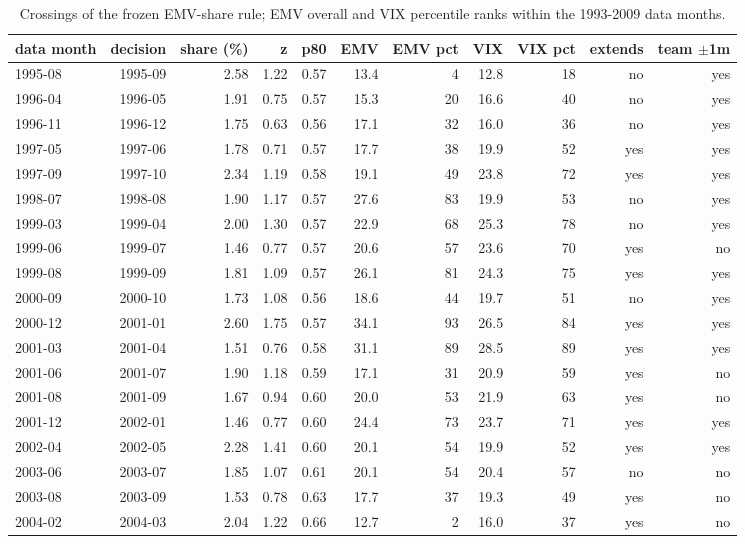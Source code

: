 \begin{table}[htbp]\centering\footnotesize\setlength{\tabcolsep}{4pt}
\caption{Crossings of the frozen EMV-share rule; EMV overall and VIX percentile ranks within the 1993-2009 data months.}
\label{tab:m8_crossings}
\begin{tabular}{lrrrrrrrrrr}
\toprule
data month & decision & share (\%) & z & p80 & EMV & EMV pct & VIX & VIX pct & extends & team $\pm$1m \\
\midrule
1995-08 & 1995-09 & 2.58 & 1.22 & 0.57 & 13.4 & 4 & 12.8 & 18 & no & yes \\
1996-04 & 1996-05 & 1.91 & 0.75 & 0.57 & 15.3 & 20 & 16.6 & 40 & no & yes \\
1996-11 & 1996-12 & 1.75 & 0.63 & 0.56 & 17.1 & 32 & 16.0 & 36 & no & yes \\
1997-05 & 1997-06 & 1.78 & 0.71 & 0.57 & 17.7 & 38 & 19.9 & 52 & yes & yes \\
1997-09 & 1997-10 & 2.34 & 1.19 & 0.58 & 19.1 & 49 & 23.8 & 72 & yes & yes \\
1998-07 & 1998-08 & 1.90 & 1.17 & 0.57 & 27.6 & 83 & 19.9 & 53 & no & yes \\
1999-03 & 1999-04 & 2.00 & 1.30 & 0.57 & 22.9 & 68 & 25.3 & 78 & no & yes \\
1999-06 & 1999-07 & 1.46 & 0.77 & 0.57 & 20.6 & 57 & 23.6 & 70 & yes & no \\
1999-08 & 1999-09 & 1.81 & 1.09 & 0.57 & 26.1 & 81 & 24.3 & 75 & yes & yes \\
2000-09 & 2000-10 & 1.73 & 1.08 & 0.56 & 18.6 & 44 & 19.7 & 51 & no & yes \\
2000-12 & 2001-01 & 2.60 & 1.75 & 0.57 & 34.1 & 93 & 26.5 & 84 & yes & yes \\
2001-03 & 2001-04 & 1.51 & 0.76 & 0.58 & 31.1 & 89 & 28.5 & 89 & yes & yes \\
2001-06 & 2001-07 & 1.90 & 1.18 & 0.59 & 17.1 & 31 & 20.9 & 59 & yes & no \\
2001-08 & 2001-09 & 1.67 & 0.94 & 0.60 & 20.0 & 53 & 21.9 & 63 & yes & no \\
2001-12 & 2002-01 & 1.46 & 0.77 & 0.60 & 24.4 & 73 & 23.7 & 71 & yes & yes \\
2002-04 & 2002-05 & 2.28 & 1.41 & 0.60 & 20.1 & 54 & 19.9 & 52 & yes & yes \\
2003-06 & 2003-07 & 1.85 & 1.07 & 0.61 & 20.1 & 54 & 20.4 & 57 & no & no \\
2003-08 & 2003-09 & 1.53 & 0.78 & 0.63 & 17.7 & 37 & 19.3 & 49 & yes & no \\
2004-02 & 2004-03 & 2.04 & 1.22 & 0.66 & 12.7 & 2 & 16.0 & 37 & yes & no \\

\end{tabular}
\end{table}
